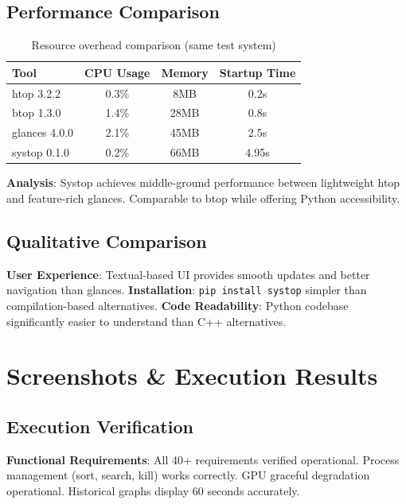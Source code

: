 \documentclass[12pt,a4paper,oneside]{report}
\begin{document}
\subsection{Performance Comparison}

\begin{table}[h]
\centering
\caption{Resource overhead comparison (same test system)}
\label{tab:perf-compare}
\small
\begin{tabular}{|l|c|c|c|}
\hline
\textbf{Tool} & \textbf{CPU Usage} & \textbf{Memory} & \textbf{Startup Time} \\
\hline
htop 3.2.2 & 0.3\% & 8MB & 0.2s \\
btop 1.3.0 & 1.4\% & 28MB & 0.8s \\
glances 4.0.0 & 2.1\% & 45MB & 2.5s \\
systop 0.1.0 & 0.2\% & 66MB & 4.95s \\
\hline
\end{tabular}
\end{table}

\textbf{Analysis}: Systop achieves middle-ground performance between lightweight htop and feature-rich glances. Comparable to btop while offering Python accessibility.

\subsection{Qualitative Comparison}

\textbf{User Experience}: Textual-based UI provides smooth updates and better navigation than glances. \textbf{Installation}: \texttt{pip install systop} simpler than compilation-based alternatives. \textbf{Code Readability}: Python codebase significantly easier to understand than C++ alternatives.

\section{Screenshots \& Execution Results}
\label{sec:screenshots}

\subsection{Execution Verification}

\textbf{Functional Requirements}: All 40+ requirements verified operational. Process management (sort, search, kill) works correctly. GPU graceful degradation operational. Historical graphs display 60 seconds accurately.
\end{document}
